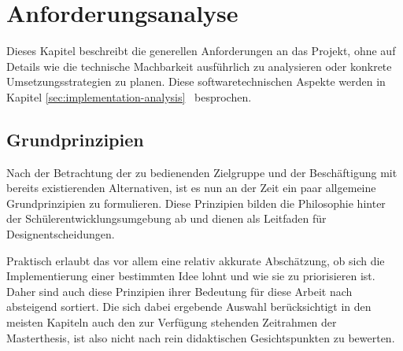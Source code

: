 \section{Anforderungsanalyse}

Dieses Kapitel beschreibt die generellen Anforderungen an das Projekt, ohne auf Details wie die technische Machbarkeit ausführlich zu analysieren oder konkrete Umsetzungsstrategien zu planen. Diese softwaretechnischen Aspekte werden in Kapitel \ref{sec:implementation-analysis}~ besprochen.


\subsection{Grundprinzipien}
\label{sec:principles}

Nach der Betrachtung der zu bedienenden Zielgruppe und der Beschäftigung mit bereits existierenden Alternativen, ist es nun an der Zeit ein paar allgemeine Grundprinzipien zu formulieren. Diese Prinzipien bilden die Philosophie hinter der Schülerentwicklungsumgebung ab und dienen als Leitfaden für Designentscheidungen.

Praktisch erlaubt das vor allem eine relativ akkurate Abschätzung, ob sich die Implementierung einer bestimmten Idee lohnt und wie sie zu priorisieren ist. Daher sind auch diese Prinzipien ihrer Bedeutung für diese Arbeit nach absteigend sortiert. Die sich dabei ergebende Auswahl berücksichtigt in den meisten Kapiteln auch den zur Verfügung stehenden Zeitrahmen der Masterthesis, ist also nicht nach rein didaktischen Gesichtspunkten zu bewerten.

